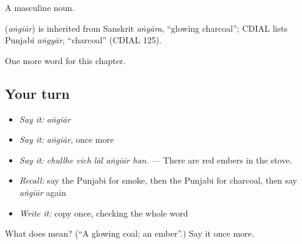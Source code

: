 A masculine noun.

\begin{cousinweb}
\textbf{} (\emph{aṅgiār}) is inherited from Sanskrit \emph{aṅgāra}, \textquotedblleft{}glowing charcoal\textquotedblright{}; CDIAL lists Punjabi \emph{aṅgyār}, \textquotedblleft{}charcoal\textquotedblright{} (CDIAL 125).
\end{cousinweb}

\begin{grammarlens}[title={What you've built}]
One more word for this chapter.
\end{grammarlens}

\subsection*{Your turn}
\begin{itemize}
\raggedright
  \item \emph{Say it:} \emph{aṅgiār}
  \item \emph{Say it:} \emph{aṅgiār}, once more
  \item \emph{Say it:} \emph{chullhe vich lāl aṅgiār han.} — There are red embers in the stove.
  \item \emph{Recall:} say the Punjabi for smoke, then the Punjabi for charcoal, then say \emph{aṅgiār} again
  \item \emph{Write it:} copy \textbf{} once, checking the whole word
\end{itemize}

\begin{tcolorbox}[breakable,colback=teal!4,colframe=teal!35!black,title={Before you move on}]
What does  mean? (\textquotedblleft{}A glowing coal; an ember\textquotedblright{}.) Say it once more.
\end{tcolorbox}

